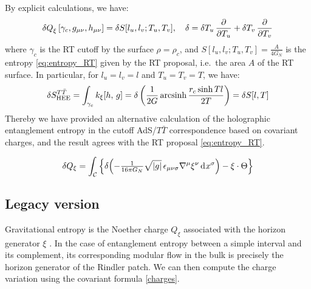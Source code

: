 \documentclass[12pt,a4paper,utf8]{article}
\begin{document}
	By explicit calculations, we have:
	\begin{equation}
		\mathinner{\delta Q}_\xi[\gamma_c,g_{\mu\nu},h_{\mu\nu}]
		= \delta S[l_u,l_v;T_u,T_v],
	\quad
		\delta
		= \mathinner{\delta T_u} \frac{\partial{}}{\partial{T_u}}
		+ \mathinner{\delta T_v} \frac{\partial{}}{\partial{T_v}} 
	\end{equation}
	where $\gamma_c$ is the RT cutoff by the surface $\rho=\rho_c$, and $S[l_u,l_v;T_u,T_v] = \frac{A}{4G_N}$ is the entropy \eqref{eq:entropy_RT} given by the RT proposal, i.e.~the area $A$ of the RT surface. 
	In particular, for $l_u = l_v = l$ and $T_u = T_v = T$, we have:
	\begin{equation}
		\delta S^{T\bar T}_{\mathrm{HEE}}=\int_{\gamma_c} k_\xi [h, \,g]
		= \delta\left(
				\frac{1}{2G} \operatorname{arcsinh}
				\frac{r_c \sinh Tl}{2T}
			\right)
		= \delta S[l,T]
	\end{equation}
	Thereby we have provided an alternative calculation of the holographic entanglement entropy in the cutoff AdS/$T\bar T$ correspondence based on covariant charges,  and the result agrees with the RT proposal \eqref{eq:entropy_RT}. 
	
	\begin{equation}
		\mathinner{\delta Q_\xi}
		= \int_{\mathcal{C}} \Big\{
				\delta\!\left(
					-\tfrac{1}{16\pi G_N}
					\sqrt{\left|g\right|}\,
					\epsilon_{\mu\nu\sigma}
					\nabla^\mu \xi^\nu
					\mathinner{\mathrm{d}^{}x^\sigma}
				\right)
				- \xi\cdot\Theta
			\Big\}
	\end{equation}
	
	
	
	
	
	
\subsection{Legacy version}
	
	Gravitational entropy is the Noether charge $Q_\xi$ associated with the horizon generator $\xi$ \cite{Lewkowycz:2013nqa,}. In the case of entanglement entropy between a simple interval and its complement, its corresponding modular flow in the bulk is precisely the horizon generator of the Rindler patch. We can then compute the charge variation using the covariant formula \eqref{charges}. 
	
\end{document}

